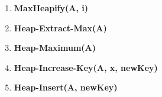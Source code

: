 
\begin{enumerate}
 

    
    \item \textbf{Max\textunderscore Heapify(A, i)}
    
    

    \newpage 

    \item \textbf{Heap-Extract-Max(A)}
    
    
    
    \newpage 
    
    \item \textbf{Heap-Maximum(A)}
    
    
    \item \textbf{Heap-Increase-Key(A, x, newKey)}
    
    
    
    \newpage
    \item \textbf{Heap-Insert(A, newKey)}
    

\end{enumerate}










